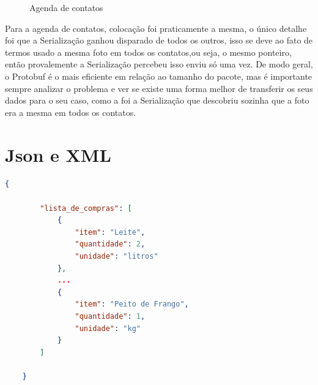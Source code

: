\documentclass{article}
\begin{document}
\begin{figure}[H]
    \centering
    \caption{Agenda de contatos}
\end{figure}
Para a agenda de contatos, colocação foi praticamente a mesma, o único detalhe foi que a Serialização ganhou disparado de todos os outros, isso se deve ao fato de termos usado a mesma foto em todos os contatos,ou seja, o mesmo ponteiro, então provalemente a Serialização percebeu isso enviu só uma vez.
De modo geral, o Protobuf é o mais eficiente em relação ao tamanho do pacote, mas é importante sempre analizar o problema e ver se existe uma forma melhor de transferir os seus dados para o seu caso, como a foi a Serialização que descobriu sozinha que a foto era a mesma em todos os contatos.

\appendix
\section{Json e XML}

\begin{lstlisting}[language=json, caption=Lista de compras Json.]
    {
        
        "lista_de_compras": [
            {
                "item": "Leite",
                "quantidade": 2,
                "unidade": "litros"
            },
            ...
            {
                "item": "Peito de Frango",
                "quantidade": 1,
                "unidade": "kg"
            }
        ]
    
    }
    \end{lstlisting}
    
\end{document}
